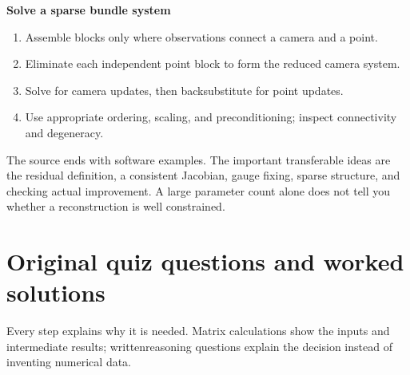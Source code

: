 \documentclass[letterpaper,11pt,english,openany,oneside]{jupyterBook}
\begin{document}
\begin{TextbookBox}
\textbf{Solve a sparse bundle system}\par\smallskip
\begin{enumerate}
%
\item {}
\sphinxAtStartPar
Assemble blocks only where observations connect a camera and a point.

\item {}
\sphinxAtStartPar
Eliminate each independent point block to form the reduced camera system.

\item {}
\sphinxAtStartPar
Solve for camera updates, then back\sphinxhyphen{}substitute for point updates.

\item {}
\sphinxAtStartPar
Use appropriate ordering, scaling, and preconditioning; inspect connectivity and degeneracy.

\end{enumerate}

\end{TextbookBox}

\sphinxAtStartPar
The source ends with software examples. The important transferable ideas are the residual definition, a consistent Jacobian, gauge fixing, sparse structure, and checking actual improvement. A large parameter count alone does not tell you whether a reconstruction is well constrained.

\ignorespaces
{}\ignorespaces
{}\ignorespaces
{}\ignorespaces
\sphinxstepscope


\section{Original quiz questions and worked solutions}
\label{\detokenize{lectures/lecture06/quiz-workbook:original-quiz-questions-and-worked-solutions}}\label{\detokenize{lectures/lecture06/quiz-workbook:lec06-quiz-workbook}}\label{\detokenize{lectures/lecture06/quiz-workbook::doc}}
\sphinxAtStartPar
{} Every step explains why it is needed. Matrix calculations show the inputs and intermediate results; written\sphinxhyphen{}reasoning questions explain the decision instead of inventing numerical data.
\end{document}
